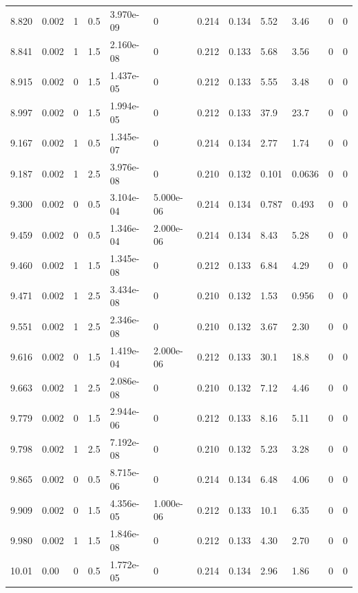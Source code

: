 \documentclass[preview]{standalone}
\begin{document}
{{{{\begin{tabular}{L{1.2cm}C{1.2cm} C{0.3cm}C{0.5cm} C{1.4cm}C{1.4cm} C{1.4cm}C{1.4cm} C{1.6cm}C{1.6cm} C{1.6cm}C{1.6cm}}
  8.820  &  0.002  & 1     & 0.5 &  3.970e-09  & 0  &  0.214&   0.134& 5.52 & 3.46   &  0 & 0  \\ 
  8.841  &  0.002  & 1     & 1.5 &  2.160e-08  & 0  &  0.212&   0.133& 5.68 & 3.56   &  0 & 0  \\ 
  8.915  &  0.002  & 0     & 1.5 &  1.437e-05  & 0  &  0.212&   0.133& 5.55 & 3.48   &  0 & 0  \\ 
  8.997  &  0.002  & 0     & 1.5 &  1.994e-05  & 0  &  0.212&   0.133& 37.9 & 23.7   &  0 & 0  \\ 
  9.167  &  0.002  & 1     & 0.5 &  1.345e-07  & 0  &  0.214&   0.134& 2.77 & 1.74   &  0 & 0  \\ 
  9.187  &  0.002  & 1     & 2.5 &  3.976e-08  & 0  &  0.210&   0.132& 0.101 & 0.0636   &  0 & 0  \\ 
  9.300  &  0.002  & 0     & 0.5 &  3.104e-04  & 5.000e-06  &  0.214&   0.134& 0.787 & 0.493   &  0 & 0  \\ 
  9.459  &  0.002  & 0     & 0.5 &  1.346e-04  & 2.000e-06  &  0.214&   0.134& 8.43 & 5.28   &  0 & 0  \\ 
  9.460  &  0.002  & 1     & 1.5 &  1.345e-08  & 0  &  0.212&   0.133& 6.84 & 4.29   &  0 & 0  \\ 
  9.471  &  0.002  & 1     & 2.5 &  3.434e-08  & 0  &  0.210&   0.132& 1.53 & 0.956   &  0 & 0  \\ 
  9.551  &  0.002  & 1     & 2.5 &  2.346e-08  & 0  &  0.210&   0.132& 3.67 & 2.30   &  0 & 0  \\ 
  9.616  &  0.002  & 0     & 1.5 &  1.419e-04  & 2.000e-06  &  0.212&   0.133& 30.1 & 18.8   &  0 & 0  \\ 
  9.663  &  0.002  & 1     & 2.5 &  2.086e-08  & 0  &  0.210&   0.132& 7.12 & 4.46   &  0 & 0  \\ 
  9.779  &  0.002  & 0     & 1.5 &  2.944e-06  & 0  &  0.212&   0.133& 8.16 & 5.11   &  0 & 0  \\ 
  9.798  &  0.002  & 1     & 2.5 &  7.192e-08  & 0  &  0.210&   0.132& 5.23 & 3.28   &  0 & 0  \\ 
  9.865  &  0.002  & 0     & 0.5 &  8.715e-06  & 0  &  0.214&   0.134& 6.48 & 4.06   &  0 & 0  \\ 
  9.909  &  0.002  & 0     & 1.5 &  4.356e-05  & 1.000e-06  &  0.212&   0.133& 10.1 & 6.35   &  0 & 0  \\ 
  9.980  &  0.002  & 1     & 1.5 &  1.846e-08  & 0  &  0.212&   0.133& 4.30 & 2.70   &  0 & 0  \\ 
  10.01  &  0.00  & 0     & 0.5 &  1.772e-05  & 0  &  0.214&   0.134& 2.96 & 1.86   &  0 & 0  \\ 

\end{tabular}}}}}
\end{document}
